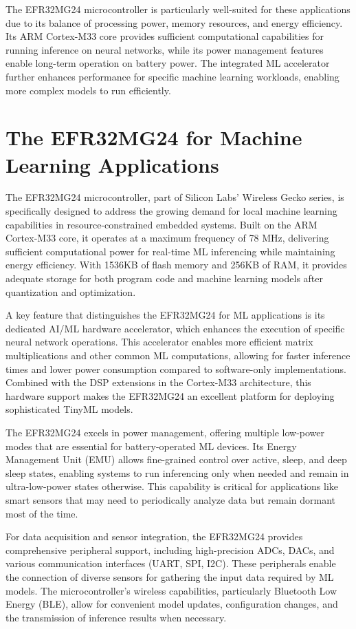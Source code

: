\documentclass[
  9pt,
  letterpaper,
  abstract,
  titlepage]{scrbook}
\begin{document}
The EFR32MG24 microcontroller is particularly well-suited for these
applications due to its balance of processing power, memory resources,
and energy efficiency. Its ARM Cortex-M33 core provides sufficient
computational capabilities for running inference on neural networks,
while its power management features enable long-term operation on
battery power. The integrated ML accelerator further enhances
performance for specific machine learning workloads, enabling more
complex models to run efficiently.

\section{The EFR32MG24 for Machine Learning
Applications}\label{the-efr32mg24-for-machine-learning-applications}

The EFR32MG24 microcontroller, part of Silicon Labs' Wireless Gecko
series, is specifically designed to address the growing demand for local
machine learning capabilities in resource-constrained embedded systems.
Built on the ARM Cortex-M33 core, it operates at a maximum frequency of
78 MHz, delivering sufficient computational power for real-time ML
inferencing while maintaining energy efficiency. With 1536KB of flash
memory and 256KB of RAM, it provides adequate storage for both program
code and machine learning models after quantization and optimization.

A key feature that distinguishes the EFR32MG24 for ML applications is
its dedicated AI/ML hardware accelerator, which enhances the execution
of specific neural network operations. This accelerator enables more
efficient matrix multiplications and other common ML computations,
allowing for faster inference times and lower power consumption compared
to software-only implementations. Combined with the DSP extensions in
the Cortex-M33 architecture, this hardware support makes the EFR32MG24
an excellent platform for deploying sophisticated TinyML models.

The EFR32MG24 excels in power management, offering multiple low-power
modes that are essential for battery-operated ML devices. Its Energy
Management Unit (EMU) allows fine-grained control over active, sleep,
and deep sleep states, enabling systems to run inferencing only when
needed and remain in ultra-low-power states otherwise. This capability
is critical for applications like smart sensors that may need to
periodically analyze data but remain dormant most of the time.

For data acquisition and sensor integration, the EFR32MG24 provides
comprehensive peripheral support, including high-precision ADCs, DACs,
and various communication interfaces (UART, SPI, I2C). These peripherals
enable the connection of diverse sensors for gathering the input data
required by ML models. The microcontroller's wireless capabilities,
particularly Bluetooth Low Energy (BLE), allow for convenient model
updates, configuration changes, and the transmission of inference
results when necessary.
\end{document}
